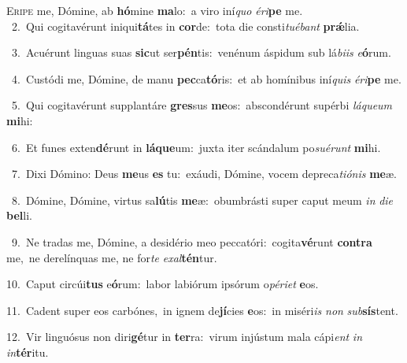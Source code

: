 \lettrine{\initial\textcolor{\initialcolor}{E}}{ripe} me, Dómine, ab \textbf{hó}\-mine \textbf{ma}\-lo:~\star a viro iní\textit{quo} \textit{é}\-\textit{ri}\textbf{pe} me.\\
{\numbfont\textcolor{\numbcolor}{~2.}}~Qui cogitavérunt iniqui\-\textbf{tá}\-tes in \textbf{cor}\-de:~\star tota die consti\-\textit{tu}\-\textit{é}\textit{bant} \textbf{prǽ}\-lia.\par
{\numbfont\textcolor{\numbcolor}{~3.}}~Acuérunt linguas suas \textbf{sic}\-ut ser\-\textbf{pén}\-tis:~\star venénum áspidum sub lá\-\textit{bi}\-\textit{is} \textit{e}\-\textbf{ó}rum.\par
{\numbfont\textcolor{\numbcolor}{~4.}}~Custódi me, Dómine, de manu \textbf{pec}\-ca\-\textbf{tó}\-ris:~\star et ab homínibus iní\textit{quis} \textit{é}\-\textit{ri}\textbf{pe} me.\par
{\numbfont\textcolor{\numbcolor}{~5.}}~Qui cogitavérunt supplantáre \textbf{gres}\-sus \textbf{me}\-os:~\star abscondérunt supérbi \textit{lá}\-\textit{que}\textit{um} \textbf{mi}\-hi:\par
{\numbfont\textcolor{\numbcolor}{~6.}}~Et funes exten\-\textbf{dé}\-runt in \textbf{lá}\-\textbf{que}um:~\star juxta iter scándalum po\-\textit{su}\-\textit{é}\textit{runt} \textbf{mi}\-hi.\par
{\numbfont\textcolor{\numbcolor}{~7.}}~Dixi Dómino: Deus \textbf{me}\-us \textbf{es} tu:~\star exáudi, Dómine, vocem depreca\-\textit{ti}\-\textit{ó}\textit{nis} \textbf{me}\-æ.\par
{\numbfont\textcolor{\numbcolor}{~8.}}~Dómine, Dómine, virtus sa\-\textbf{lú}\-tis \textbf{me}\-æ:~\star obumbrásti super caput meum \textit{in} \textit{di}\-\textit{e} \textbf{bel}\-li.\par
{\numbfont\textcolor{\numbcolor}{~9.}}~Ne tradas me, Dómine, a desidério meo peccatóri:~\dagger cogita\-\textbf{vé}\-runt \textbf{con}\-\textbf{tra} me,~\star ne derelínquas me, ne for\textit{te} \textit{ex}\-\textit{al}\textbf{tén}tur.\par
{\numbfont\textcolor{\numbcolor}{10.}}~Caput circúi\textbf{tus} e\-\textbf{ó}\-rum:~\star labor labiórum ipsórum o\-\textit{pé}\-\textit{ri}\textit{et} \textbf{e}\-os.\par
{\numbfont\textcolor{\numbcolor}{11.}}~Cadent super eos carbónes,~\dagger in ignem de\-\textbf{jí}\-cies \textbf{e}\-os:~\star in miséri\textit{is} \textit{non} \textit{sub}\-\textbf{sís}tent.\par
{\numbfont\textcolor{\numbcolor}{12.}}~Vir linguósus non diri\-\textbf{gé}\-tur in \textbf{ter}\-ra:~\star virum injústum mala cápi\textit{ent} \textit{in} \textit{in}\-\textbf{tér}itu.\par
